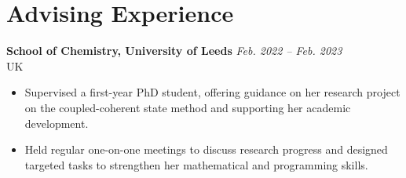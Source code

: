 \section{\sc Advising Experience}
{\bf  School of Chemistry, University of Leeds } \hfill   \textit{Feb. 2022 -- Feb. 2023} \\
\null \hfill UK
\begin{itemize}
    \setlength\itemsep{0em}
    \item  Supervised a first-year PhD student, offering guidance on her research project on the coupled-coherent state method and supporting her academic development.
    \item Held regular one-on-one meetings to discuss research progress and designed targeted tasks to strengthen her mathematical and programming skills.
\end{itemize}
\endinput